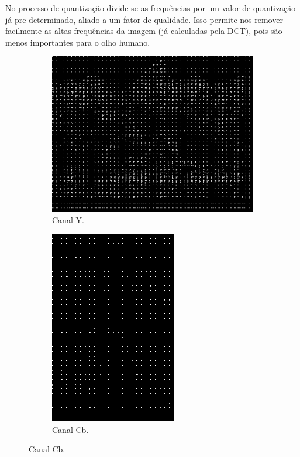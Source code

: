 \documentclass[a4paper, 12pt]{article}
\begin{document}
    No processo de quantização divide-se as frequências por um valor de quantização já
    pre-determinado, aliado a um fator de qualidade.
    Isso permite-nos remover facilmente as altas frequências da imagem (já calculadas pela DCT), 
    pois são menos importantes para o olho humano.
        \begin{figure}[H]
            \begin{subfigure}{0.3\textwidth}
                \centering
                \includegraphics[scale=0.5]{resources/Quantization/YQuantization10.png}
                \caption{ Canal Y.}
            \end{subfigure}
            \hfill
            \begin{subfigure}{0.3\textwidth}
                \centering 
                \includegraphics[scale=0.5]{resources/Quantization/CBQuantization10.png}
                \caption{ Canal Cb.}
            \end{subfigure}
            \hfill

\end{figure}
\end{document}
